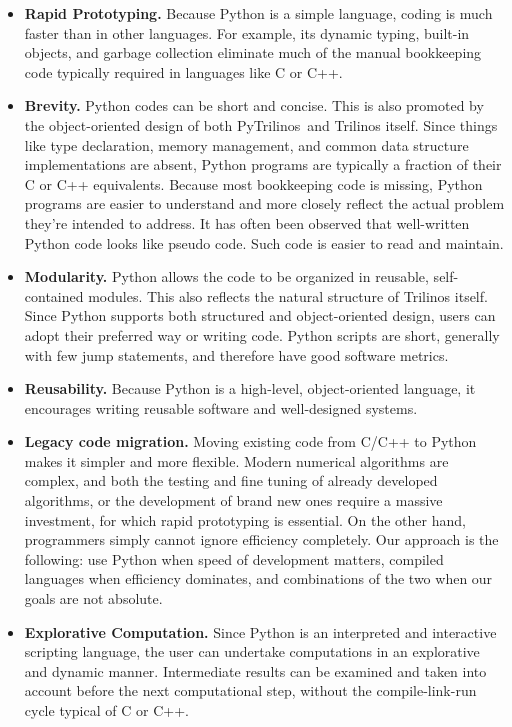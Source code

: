 \documentclass[10pt,relax]{SANDreport}
\newcommand{\PyTrilinos}{{PyTrilinos}}
\begin{document}
\begin{itemize}

\item {\bf Rapid Prototyping.}  Because Python is a simple language,
  coding is much faster than in other languages. For example, its
  dynamic typing, built-in objects, and garbage collection eliminate
  much of the manual bookkeeping code typically required in languages
  like C or C++.

\item {\bf Brevity.} Python codes can be short and concise. This is
  also promoted by the object-oriented design of both \PyTrilinos\ and
  Trilinos itself.  Since things like type declaration, memory
  management, and common data structure implementations are absent,
  Python programs are typically a fraction of their C or C++
  equivalents.  Because most bookkeeping code is missing, Python
  programs are easier to understand and more closely reflect the
  actual problem they're intended to address.  It has often been
  observed that well-written Python code looks like pseudo code.  Such
  code is easier to read and maintain.

\item {\bf Modularity.} Python allows the code to be organized in
  reusable, self-contained modules.  This also reflects the natural
  structure of Trilinos itself. Since Python supports both structured and
  object-oriented design, users can adopt their preferred way or writing code.
  Python scripts are short, generally with few jump statements, and therefore
  have good software metrics.

\item {\bf Reusability.} Because Python is a high-level,
  object-oriented language, it encourages writing reusable software
  and well-designed systems.

\item {\bf Legacy code migration.} Moving existing code from C/C++ to
  Python makes it simpler and more flexible.  Modern numerical
  algorithms are complex, and both the testing and fine tuning of
  already developed algorithms, or the development of brand new ones
  require a massive investment, for which rapid prototyping is
  essential. On the other hand, programmers simply cannot ignore
  efficiency completely. Our approach is the following: use Python
  when speed of development matters, compiled languages when
  efficiency dominates, and combinations of the two when our goals are
  not absolute.

\item {\bf Explorative Computation.} Since Python is an interpreted
  and interactive scripting language, the user can undertake
  computations in an explorative and dynamic manner. Intermediate
  results can be examined and taken into account before the next
  computational step, without the compile-link-run cycle typical of C
  or C++.


\end{itemize}
\end{document}
